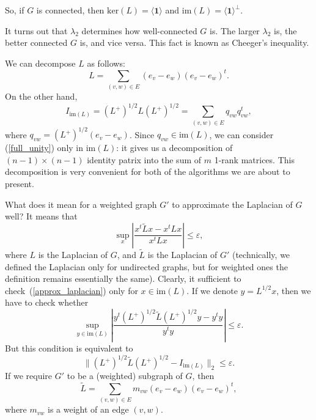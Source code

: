 \documentclass[12pt]{article}
\newcommand{\eps}{\varepsilon}
\begin{document}
    So, if $G$ is connected, then $\mathrm{ker}(L) = \langle \mathbf{1} \rangle$
    and $\mathrm{im}(L) = \langle \mathbf{1} \rangle^{\perp}$.

    It turns out that $\lambda_2$ determines how well-connected $G$ is. The larger
    $\lambda_2$ is, the better connected $G$ is, and vice versa. This fact is known
    as Cheeger's inequality.

    We can decompose $L$ as follows:
    $$
        L = \sum_{(v,w) \in E} (e_v - e_w) (e_v - e_w)^t.
    $$
    On the other hand,
    \begin{equation}
        \label{full_unity}
        I_{\mathrm{im}(L)} = (L^+)^{1/2} L (L^+)^{1/2} = \sum_{(v,w) \in E} q_{vw} q_{vw}^t,
    \end{equation}
    where $q_{vw} = (L^+)^{1/2} (e_v - e_w)$. Since $q_{vw} \in \mathrm{im}(L)$, we can
    consider (\ref{full_unity}) only in $\mathrm{im}(L)$: it gives us a decomposition of
    $(n-1)\times(n-1)$ identity patrix into the sum of $m$ 1-rank matrices.
    This decomposition is very convenient for both of the algorithms we are about to
    present.

    What does it mean for a weighted graph $G'$ to approximate the Laplacian of $G$ well?
    It means that
    \begin{equation}
        \label{approx_laplacian}
        \sup_x \left|\frac{x^t \tilde{L} x - x^t L x}{x^t L x}\right|\leq \eps,
    \end{equation}
    where $L$ is the Laplacian of $G$, and $\tilde{L}$ is the Laplacian of $G'$
    (technically, we defined the Laplacian only for undirected graphs, but for weighted
    ones the definition remains essentially the same).
    Clearly, it sufficient to check~(\ref{approx_laplacian}) only for
    $x \in \mathrm{im}(L)$.
    If we denote $y = L^{1/2} x$, then we have to check whether
    $$
        \sup_{y \in \mathrm{im}(L)} \left|\frac{y^t (L^+)^{1/2}
            \tilde{L} (L^+)^{1/2} y - y^t y}{y^t y}\right| \leq \eps.
    $$
    But this condition is equivalent to
    \begin{equation}
        \label{closeness}
        \|(L^+)^{1/2} \tilde{L} (L^+)^{1/2} - I_{\mathrm{im}(L)}\|_2 \leq \eps.
    \end{equation}
    If we require $G'$ to be a (weighted) subgraph of $G$, then
    \begin{equation}
        \label{subgraph}
        \tilde{L} = \sum_{(v,w)\in E} m_{vw} (e_v - e_w) (e_v - e_w)^t,
    \end{equation}
    where $m_{vw}$ is a weight of an edge $(v, w)$.
\end{document}
